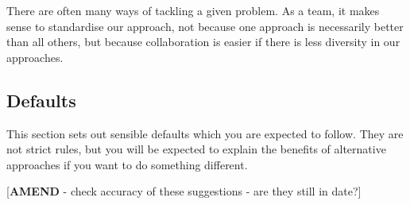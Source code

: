 \documentclass[]{book}
\begin{document}
There are often many ways of tackling a given problem. As a team, it makes sense to standardise our approach, not because one approach is necessarily better than all others, but because collaboration is easier if there is less diversity in our approaches.

\hypertarget{defaults}{%
\subsection*{Defaults}\label{defaults}}

This section sets out sensible defaults which you are expected to follow. They are not strict rules, but you will be expected to explain the benefits of alternative approaches if you want to do something different.

{[}\textbf{AMEND} - check accuracy of these suggestions - are they still in date?{]}
\end{document}
